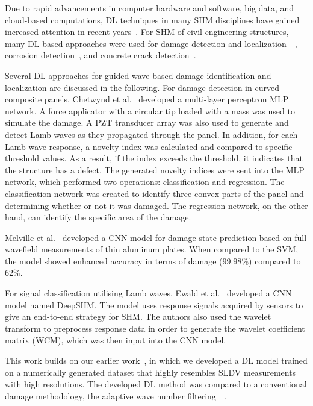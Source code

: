 \documentclass[runningheads]{llncs}
\begin{document}
Due to rapid advancements in computer hardware and software, big data, and cloud-based computations, DL techniques in many SHM disciplines have gained increased attention in recent years~\cite{Azimi}.
For SHM of civil engineering structures, many DL-based approaches were used for damage detection and localization~\cite{Cha2018}~\cite{Kong2018}, corrosion detection~\cite{Atha2018}, and concrete crack detection~\cite{Dung2019}.


Several DL approaches for guided wave-based damage identification and localization are discussed in the following.
For damage detection in curved composite panels, Chetwynd et al.~\cite{Chetwynd2008} developed a multi-layer perceptron MLP network.
A force applicator with a circular tip loaded with a mass was used to simulate the damage.
A PZT transducer array was also used to generate and detect Lamb waves as they propagated through the panel.
In addition, for each Lamb wave response, a novelty index was calculated and compared to specific threshold values.
As a result, if the index exceeds the threshold, it indicates that the structure has a defect.
The generated novelty indices were sent into the MLP network, which performed two operations: classification and regression.
The classification network was created to identify three convex parts of the panel and determining whether or not it was damaged.
The regression network, on the other hand, can identify the specific area of the damage.

Melville et al.~\cite{Melville2018} developed a CNN model for damage state prediction based on full wavefield measurements of thin aluminum plates.
When compared to the SVM, the model showed enhanced accuracy in terms of damage (\(99.98\%\)) compared to \(62\%\).

For signal classification utilising Lamb waves, Ewald et al.~\cite{Ewald2019} developed a CNN model named DeepSHM.
The model uses response signals acquired by sensors to give an end-to-end strategy for SHM.
The authors also used the wavelet transform to preprocess response data in order to generate the wavelet coefficient matrix (WCM), which was then input into the CNN model.

This work builds on our earlier work~\cite{Ijjeh2021}, in which we developed a DL model trained on a numerically generated dataset that highly resembles SLDV measurements with high resolutions.
The developed DL method was compared to a conventional damage methodology, the adaptive wave number filtering~\cite{Kudela2015}~\cite{Radzienski2019a}.
\end{document}
